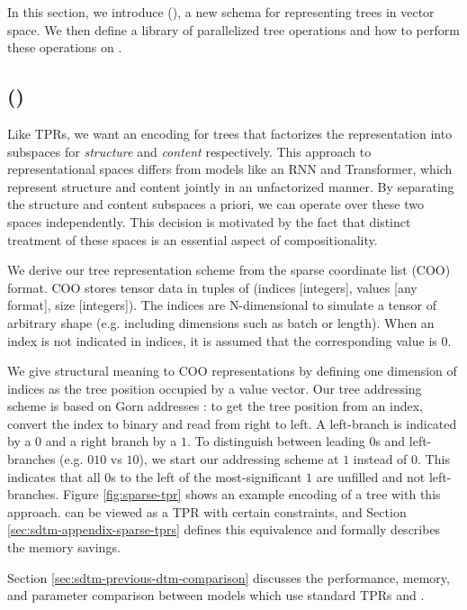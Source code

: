 In this section, we introduce \fullrepname (\abvrepname), a new schema for representing trees in vector space. We then define a library of parallelized tree operations and how to perform these operations on \abvrepname.

\subsection{\fullrepname (\abvrepname)} 
\label{sec:sdtm-sparse-tpr}
Like TPRs, we want an encoding for trees that factorizes the representation into subspaces for \emph{structure} and \emph{content} respectively. This approach to representational spaces differs from models like an RNN and Transformer, which represent structure and content jointly in an unfactorized manner.
By separating the structure and content subspaces a priori, we can operate over these two spaces independently. This decision is motivated by the fact that distinct treatment of these spaces is an essential aspect of compositionality.

We derive our tree representation scheme from the sparse coordinate list (COO) format. COO stores tensor data in tuples of (indices [integers], values [any format], size [integers]). The indices are N-dimensional to simulate a tensor of arbitrary shape (e.g. including dimensions such as batch or length). When an index is not indicated in indices, it is assumed that the corresponding value is 0.

We give structural meaning to COO representations by defining one dimension of indices as the tree position occupied by a value vector. Our tree addressing scheme is based on Gorn addresses \citep{gorn+1967+77+115}: to get the tree position from an index, convert the index to binary and read from right to left. A left-branch is indicated by a $0$ and a right branch by a $1$. To distinguish between leading $0$s and left-branches (e.g. $010$ vs $10$), we start our addressing scheme at $1$ instead of $0$. This indicates that all $0$s to the left of the most-significant $1$ are unfilled and not left-branches. 
Figure \ref{fig:sparse-tpr} shows an example encoding of a tree with this approach. \abvrepname can be viewed as a TPR with certain constraints, and Section \ref{sec:sdtm-appendix-sparse-tprs} defines this equivalence and formally describes the memory savings.

Section \ref{sec:sdtm-previous-dtm-comparison} discusses the performance, memory, and parameter comparison between \dtm models which use standard TPRs and \abvrepname.

